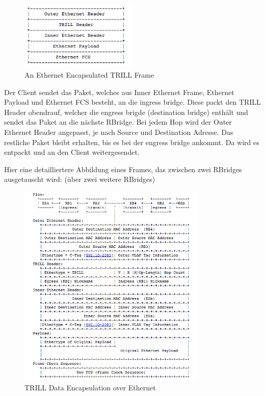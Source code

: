 \documentclass[a4,12pt]{scrartcl}
\begin{document}
\begin{figure} [H]
	\begin{center}
	\includegraphics[width=0.50\textwidth]{./pictures/trill_encapsulation.png}
	\caption{An Ethernet Encapsulated TRILL Frame}
	\label{x}
	\end{center}
\end{figure}

\noindent Der Client sendet das Paket, welches aus Inner Ethernet Frame, Ethernet Payload und Ethernet FCS besteht, an die ingress bridge. Diese packt den TRILL Header obendrauf, welcher die engress brigde (destination bridge) enthält und sendet das Paket an die nächste RBridge. Bei jedem Hop wird der Outer Ethernet Header angepasst, je nach Source und Destination Adresse. Das restliche Paket bleibt erhalten, bis es bei der engress bridge ankommt. Da wird es entpackt und an den Client weitergesendet. 
\newpage

\noindent Hier eine detailliertere Abbildung eines Frames, das zwischen zwei RBridges ausgetauscht wird: (über zwei weitere RBridges) 
\begin{figure} [H]
	\begin{center}
	\includegraphics[width=0.80\textwidth]{./pictures/trill_frame_flow.png}
	\caption{TRILL Data Encapsulation over Ethernet}
	\label{x}
	\end{center}
\end{figure}
\end{document}
